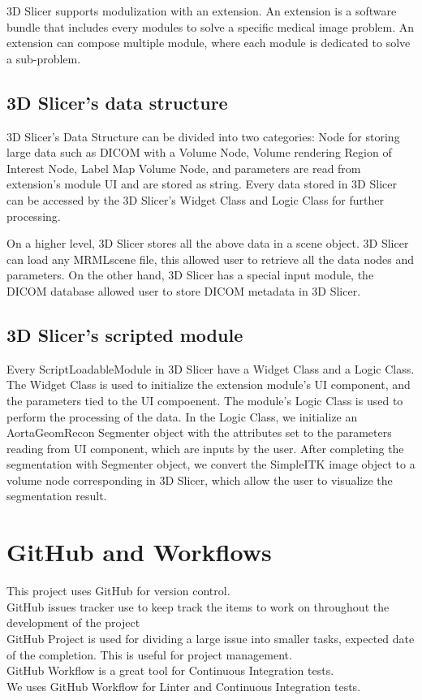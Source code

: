 3D Slicer supports modulization with an extension. An extension is a software bundle that includes every modules to solve a specific medical image problem. An extension can compose multiple module, where each module is dedicated to solve a sub-problem.


\subsection{3D Slicer's data structure}

3D Slicer's Data Structure can be divided into two categories: Node for storing large data such as DICOM with a Volume Node, Volume rendering Region of Interest Node, Label Map Volume Node, and parameters are read from extension's module UI and are stored as string. Every data stored in 3D Slicer can be accessed by the 3D Slicer's Widget Class and Logic Class for further processing.

On a higher level, 3D Slicer stores all the above data in a scene object. 3D Slicer can load any MRMLscene file, this allowed user to retrieve all the data nodes and parameters. On the other hand, 3D Slicer has a special input module, the DICOM database allowed user to store DICOM metadata in 3D Slicer.

\subsection{3D Slicer's scripted module}

Every ScriptLoadableModule in 3D Slicer have a Widget Class and a Logic Class. The Widget Class is used to initialize the extension module's UI component, and the parameters tied to the UI compoenent. The module's Logic Class is used to perform the processing of the data. In the Logic Class, we initialize an AortaGeomRecon Segmenter object with the attributes set to the parameters reading from UI component, which are inputs by the user. After completing the segmentation with Segmenter object, we convert the SimpleITK image object to a volume node corresponding in 3D Slicer, which allow the user to visualize the segmentation result. 

\section{GitHub and Workflows}
This project uses GitHub for version control. \\
GitHub issues tracker use to keep track the items to work on throughout the development of the project\\
GitHub Project is used for dividing a large issue into smaller tasks, expected date of the completion. This is useful for project management.\\
GitHub Workflow is a great tool for Continuous Integration tests. \\
We uses GitHub Workflow for Linter and Continuous Integration tests. 


